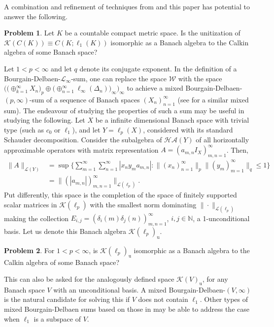 \documentclass[11pt]{amsart}
\theoremstyle{definition}
\newtheorem{problem}{Problem}
\newcommand{\N}{\mathbb{N}}
\numberwithin{equation}{section}
\begin{document}
A combination and refinement of techniques from \cite{motakis:puglisi:zisimopoulou:2016} and this paper has potential to answer the following.
\begin{problem}
Let $K$ be a countable compact metric space. Is the unitization of $\mathcal{K}(C(K))\equiv C(K;\ell_1(K))$ isomorphic as a Banach algebra to the Calkin algebra of some Banach space?
\end{problem}





 Let $1<p<\infty$ and let $q$ denote its conjugate exponent. In the definition of a Bourgain-Delbaen-$\mathscr{L}_\infty$-sum, one can replace the space $\mathcal{W}$ with the space $\big(\big(\oplus_{k=1}^\infty X_n\big)_p\oplus \big(\oplus_{n=1}^\infty\ell_\infty(\Delta_n)\big)_\infty\big)_\infty$ to achieve a mixed Bourgain-Delbaen-$(p,\infty)$-sum of a sequence of Banach spaces $(X_n)_{n=1}^\infty$ (see \cite{motakis:puglisi:tolias:2020} for a similar mixed sum). The endeavour of studying the properties of such a sum may be useful in studying the following. Let $X$ be a infinite dimensional Banach space with trivial type (such as $c_0$ or $\ell_1$), and let $Y = \ell_p(X)$, considered with its standard Schauder decomposition. Consider the subalgebra of $\mathcal{HA}(Y)$ of all horizontally approximable operators with matrix representation $A = (a_{m,n}I_{X})_{m,n=1}^\infty$. Then,
\[
\begin{split}
\|A\|_{\mathcal{L}(Y)} &= \sup\Big\{\sum_{m=1}^\infty\sum_{n=1}^\infty |x_ny_ma_{m,n}|: \|(x_n)_{n=1}^\infty\|_p\|(y_m)_{m=1}^\infty\|_q\leq 1\Big\}\\
& = \|(|a_{m,n}|)_{m,n=1}^\infty\|_{\mathcal{L}(\ell_p)}.
\end{split}
\]
Put differently, this space is the completion of the space of finitely supported scalar matrices in $\mathcal{K}(\ell_p)$ with the smallest norm dominating $\|\cdot\|_{\mathcal{L}(\ell_p)}$ making the collection $E_{i,j} = (\delta_i(m)\delta_j(n))_{m,n=1}^\infty$, $i,j\in\N$, a 1-unconditional basis. Let us denote this Banach algebra $\mathcal{K}(\ell_p)_\mathrm{u}$.

\begin{problem}
\label{unconditionalization of compacts}
For $1<p<\infty$, is $\mathcal{K}(\ell_p)_\mathrm{u}$ isomorphic as a Banach algebra to the Calkin algebra of some Banach space?
\end{problem}

This can also be asked for the analogously defined space $\mathcal{K}(V)_\mathrm{u}$, for any Banach space $V$ with an unconditional basis. A mixed Bourgain-Delbaen-$(V,\infty)$ is the natural candidate for solving this if $V$ does not contain $\ell_1$. Other types of mixed Bourgain-Delbaen sums based on those in \cite{motakis:puglisi:tolias:2020} may be able to address the case when $\ell_1$ is a subspace of $V$.
\end{document}
